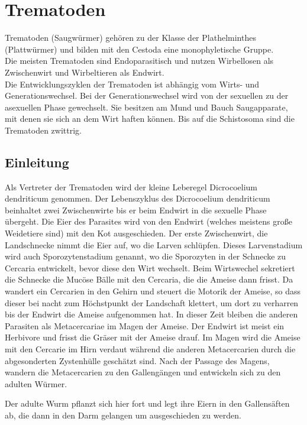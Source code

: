 \documentclass[oneside,10pt,a4paper]{report}
\begin{document}
	
	
	\chapter{Trematoden}
		Trematoden (Saugwürmer) gehören zu der Klasse der Plathelminthes (Plattwürmer) und bilden mit den Cestoda eine monophyletische Gruppe.\\
		Die meisten Trematoden sind Endoparasitisch und nutzen Wirbellosen als Zwischenwirt und Wirbeltieren als Endwirt.\\
		Die Entwicklungszyklen der Trematoden ist abhängig vom Wirts- und Generationswechsel. Bei der Generationswechsel wird von der sexuellen zu der asexuellen Phase gewechselt.
		Sie besitzen am Mund und Bauch Saugapparate, mit denen sie sich an dem Wirt haften können. Bis auf die Schistosoma sind die Trematoden zwittrig.
		
		\section{Einleitung}
			Als Vertreter der Trematoden wird der kleine Leberegel Dicrocoelium dendriticum genommen.
			Der Lebenszyklus des Dicrocoelium dendriticum beinhaltet zwei Zwischenwirte bis er beim Endwirt in die sexuelle Phase übergeht.
			Die Eier des Parasites wird von den Endwirt (welches meistens große Weidetiere sind) mit den Kot ausgeschieden. Der erste Zwischenwirt, die
			Landschnecke nimmt die Eier auf, wo die Larven schlüpfen. Dieses Larvenstadium wird auch Sporozytenstadium genannt, wo die Sporozyten in der Schnecke
			zu Cercaria entwickelt, bevor diese den Wirt wechselt. Beim Wirtswechel sekretiert die Schnecke die Mucöse Bälle mit den Cercaria, die die
			Ameise dann frisst. Da wandert ein Cercarien in den Gehirn und steuert die Motorik der Ameise, so dass dieser bei nacht zum Höchstpunkt der
			Landschaft klettert, um dort zu verharren bis der Endwirt die Ameise aufgenommen hat. In dieser Zeit bleiben die anderen Parasiten als
			Metacercariae im Magen der Ameise.
			Der Endwirt ist meist ein Herbivore und frisst die Gräser mit der Ameise drauf. Im Magen wird die Ameise mit den Cercarie im Hirn verdaut
			während die anderen Metacercarien durch die abgesonderten Zystenhülle geschätzt sind.
			Nach der Passage des Magens, wandern die Metacercarien zu den Gallengängen und entwickeln sich zu den adulten Würmer.
			
			Der adulte Wurm pflanzt sich hier fort und legt ihre Eiern in den Gallensäften ab, die dann in den Darm gelangen um ausgeschieden
			zu werden.
			
\end{document}
